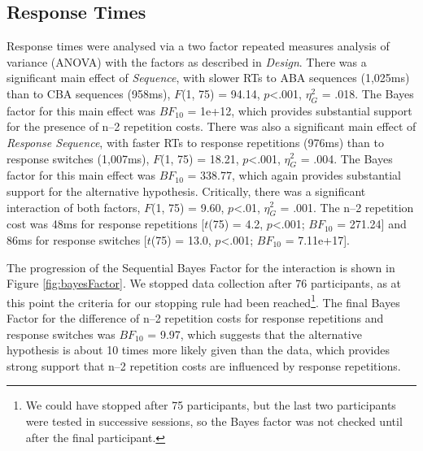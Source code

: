 \documentclass[a4paper, man, natbib]{apa6}
\begin{document}
\subsection{Response Times}
Response times were analysed via a two factor repeated measures analysis of variance (ANOVA) with the factors as described in \emph{Design}. There was a significant main effect of \emph{Sequence}, with slower RTs to ABA sequences (1,025ms) than to CBA sequences (958ms), $F$(1, 75) = 94.14, $p$<.001, $\eta_G^2$ = .018. The Bayes factor for this main effect was $BF_{10}$ = 1e+12, which provides substantial support for the presence of n--2 repetition costs. There was also a significant main effect of \emph{Response Sequence}, with faster RTs to response repetitions (976ms) than to response switches (1,007ms), $F$(1, 75) = 18.21, $p$<.001, $\eta_G^2$ = .004. The Bayes factor for this main effect was $BF_{10}$ = 338.77, which again provides substantial support for the alternative hypothesis. Critically, there was a significant interaction of both factors, $F$(1, 75) = 9.60, $p$<.01, $\eta_G^2$ = .001. The n--2 repetition cost was 48ms for response repetitions [$t$(75) = 4.2, $p$<.001; $BF_{10}$ = 271.24] and 86ms for response switches [$t$(75) = 13.0, $p$<.001; $BF_{10}$ = 7.11e+17]. 

The progression of the Sequential Bayes Factor for the interaction is shown in Figure \ref{fig:bayesFactor}. We stopped data collection after 76 participants, as at this point the criteria for our stopping rule had been reached\footnote{We could have stopped after 75 participants, but the last two participants were tested in successive sessions, so the Bayes factor was not checked until after the final participant.}. The final Bayes Factor for the difference of n--2 repetition costs for response repetitions and response switches was $BF_{10}$ = 9.97, which suggests that the alternative hypothesis is about 10 times more likely given than the data, which provides strong support that n--2 repetition costs are influenced by response repetitions.
\end{document}
